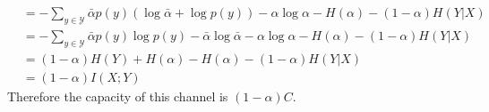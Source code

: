 \begin{exercise}
\begin{solution}
\begin{equation}
\begin{aligned}
      &= - \sum_{y\in\mathcal{Y}} \bar{\alpha}p(y) \left( \log \bar{\alpha} + \log p(y) \right)  - \alpha\log\alpha - H(\alpha) -  (1-\alpha) H(Y|X) \\
      &= - \sum_{y\in\mathcal{Y}} \bar{\alpha} p(y)  \log p(y) -\bar{\alpha}\log\bar{\alpha} - \alpha\log\alpha - H(\alpha) -  (1-\alpha) H(Y|X) \\
      &= (1-\alpha) H(Y) + H(\alpha)  - H(\alpha)  -  (1-\alpha) H(Y|X)  \\
      &= (1-\alpha) I(X;Y)
    \end{aligned}
  \end{equation}
  Therefore the capacity of this channel is $(1-\alpha)C$.
  \end{solution}
  \label{ex7-5}
\end{exercise}


